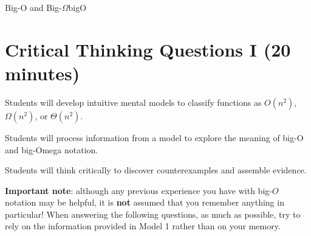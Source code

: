 \documentclass{tufte-handout}
\begin{document}
\begin{model}{Big-O and Big-$\Omega$}{bigO}
\begin{center}
\begin{minipage}{\textwidth}
\end{minipage}

\end{center}
\end{model}

\newpage
\section{Critical Thinking Questions I (20 minutes)}
\begin{objective}
Students will develop intuitive mental models to classify
  functions as $O(n^2)$, $\Omega(n^2)$, or $\Theta(n^2)$.
\end{objective}

\begin{pobjective}
  Students will process information from a model to explore the
  meaning of big-O and big-Omega notation.
\end{pobjective}

\begin{pobjective}
  Students will think critically to discover counterexamples
  and assemble evidence.
\end{pobjective}

\textbf{Important note}: although any previous experience you have
with big-$O$ notation may be helpful, it is \textbf{not} assumed that
you remember anything in particular!  When answering the following
questions, as much as possible, try to rely on the information
provided in Model 1 rather than on your memory.
\end{document}
